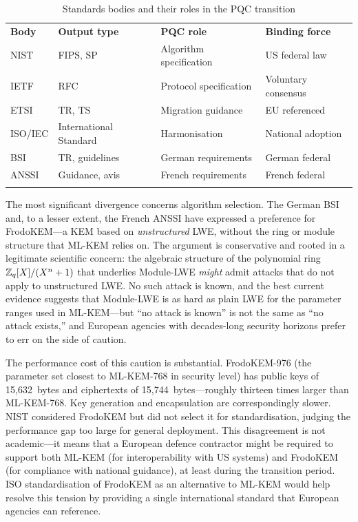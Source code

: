 \begin{table}[t]
\caption{Standards bodies and their roles in the PQC transition}
\label{tab:standards-bodies}
\begin{tabular}{p{2.2cm}p{3cm}p{3.3cm}p{3cm}}
\hline\noalign{\smallskip}
\textbf{Body} & \textbf{Output type} & \textbf{PQC role} & \textbf{Binding force} \\
\noalign{\smallskip}\svhline\noalign{\smallskip}
NIST & FIPS, SP & Algorithm specification & US federal law \\
IETF & RFC & Protocol specification & Voluntary consensus \\
ETSI & TR, TS & Migration guidance & EU referenced \\
ISO/IEC & International Standard & Harmonisation & National adoption \\
BSI & TR, guidelines & German requirements & German federal \\
ANSSI & Guidance, avis & French requirements & French federal \\
\noalign{\smallskip}\hline
\end{tabular}
\end{table}

The most significant divergence concerns algorithm selection. The German BSI and, to a lesser extent, the French ANSSI have expressed a preference for FrodoKEM---a KEM based on \emph{unstructured} LWE, without the ring or module structure that ML-KEM relies on. The argument is conservative and rooted in a legitimate scientific concern: the algebraic structure of the polynomial ring $\mathbb{Z}_q[X]/(X^n+1)$ that underlies Module-LWE \emph{might} admit attacks that do not apply to unstructured LWE. No such attack is known, and the best current evidence suggests that Module-LWE is as hard as plain LWE for the parameter ranges used in ML-KEM---but ``no attack is known'' is not the same as ``no attack exists,'' and European agencies with decades-long security horizons prefer to err on the side of caution.

The performance cost of this caution is substantial. FrodoKEM-976 (the parameter set closest to ML-KEM-768 in security level) has public keys of 15,632~bytes and ciphertexts of 15,744~bytes---roughly thirteen times larger than ML-KEM-768. Key generation and encapsulation are correspondingly slower. NIST considered FrodoKEM but did not select it for standardisation, judging the performance gap too large for general deployment. This disagreement is not academic---it means that a European defence contractor might be required to support both ML-KEM (for interoperability with US systems) and FrodoKEM (for compliance with national guidance), at least during the transition period. ISO standardisation of FrodoKEM as an alternative to ML-KEM would help resolve this tension by providing a single international standard that European agencies can reference.

